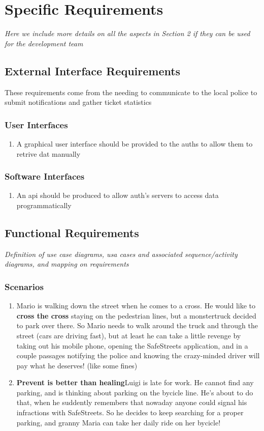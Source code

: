 \documentclass{article}
\newcommand{\enum}[1]{\texttt{#1.\arabic*}}
\begin{document}
\section{Specific Requirements} \textit{Here we include more details on all the aspects in Section 2 if they can be used for the development team}
	\subsection{External Interface Requirements}
		These requirements come from the needing to communicate to the local police to submit notifications and gather ticket statistics
		\subsubsection{User Interfaces}
			\begin{enumerate}
				\item A graphical user interface should be provided to the auths to allow them to retrive dat manually
			\end{enumerate}
		\subsubsection{Software Interfaces}
			\begin{enumerate}
					\item An api should be produced to allow auth's servers to access data programmatically
			\end{enumerate}
	\subsection{Functional Requirements} \textit{Definition of use case diagrams, usa cases and associated sequence/activity diagrams, and mapping on requirements}
		\subsubsection{Scenarios}
			\begin{enumerate}[label=\enum{S}]
				\item \label{S_The man, the street and the monstertruck}
				Mario is walking down the street when he comes to a cross. He would like to \textbf{cross the cross} staying on the pedestrian lines, but a monstertruck decided to park over there. So Mario needs to walk around the truck and through the street (cars are driving fast), but at least he can take a little revenge by taking out his mobile phone, opening the SafeStreets application, and in a couple passages notifying the police and knowing the crazy-minded driver will pay what he deserves! (like some fines)
			\item \textbf{Prevent is better than healing}Luigi is late for work. He cannot find any parking, and is thinking about parking on the bycicle line. He's about to do that, when he suddently remembers that nowaday anyone could signal his infractions with SafeStreets. So he decides to keep searching for a proper parking, and granny Maria can take her daily ride on her bycicle!
			\end{enumerate}
			
\end{document}
